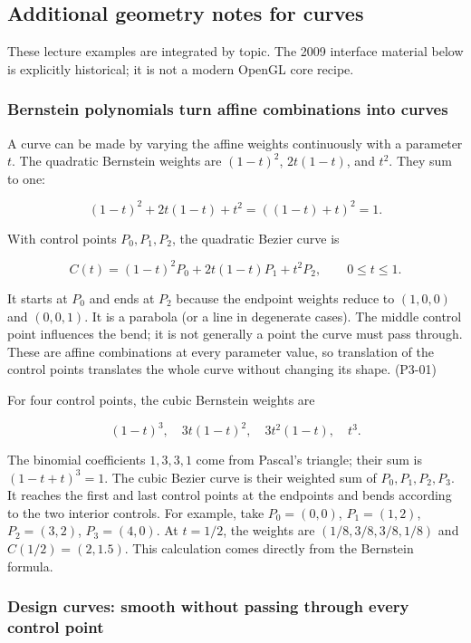 \subsection{Additional geometry notes for curves}\label{03-visual-computing-i-ch001-additional-geometry-notes-for-curves}

These lecture examples are integrated by topic. The 2009 interface material below is explicitly historical; it is not a modern OpenGL core recipe.

\subsubsection{Bernstein polynomials turn affine combinations into curves}\label{03-visual-computing-i-ch001-bernstein-polynomials-turn-affine-combinations-into-curves}

A curve can be made by varying the affine weights continuously with a parameter \(t\). The quadratic Bernstein weights are \((1-t)^2\), \(2t(1-t)\), and \(t^2\). They sum to one:

\[
(1-t)^2+2t(1-t)+t^2=((1-t)+t)^2=1.
\]

With control points \(P_0,P_1,P_2\), the quadratic Bezier curve is

\[
C(t)=(1-t)^2P_0+2t(1-t)P_1+t^2P_2,\qquad 0\leq t\leq1.
\]

It starts at \(P_0\) and ends at \(P_2\) because the endpoint weights reduce to \((1,0,0)\) and \((0,0,1)\). It is a parabola (or a line in degenerate cases). The middle control point influences the bend; it is not generally a point the curve must pass through. These are affine combinations at every parameter value, so translation of the control points translates the whole curve without changing its shape. (P3-01)

For four control points, the cubic Bernstein weights are

\[
(1-t)^3,\quad 3t(1-t)^2,\quad 3t^2(1-t),\quad t^3.
\]

The binomial coefficients \(1,3,3,1\) come from Pascal's triangle; their sum is \((1-t+t)^3=1\). The cubic Bezier curve is their weighted sum of \(P_0,P_1,P_2,P_3\). It reaches the first and last control points at the endpoints and bends according to the two interior controls. For example, take \(P_0=(0,0)\), \(P_1=(1,2)\), \(P_2=(3,2)\), \(P_3=(4,0)\). At \(t=1/2\), the weights are \((1/8,3/8,3/8,1/8)\) and \(C(1/2)=(2,1.5)\). This calculation comes directly from the Bernstein formula.

\subsubsection{Design curves: smooth without passing through every control point}\label{03-visual-computing-i-ch001-design-curves-smooth-without-passing-through-every-control-point}

